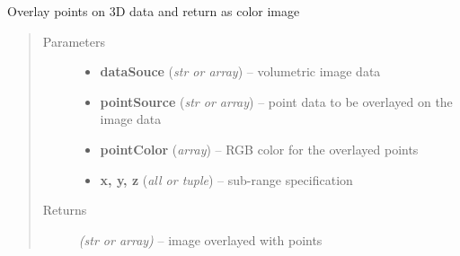 \documentclass[letterpaper,10pt,english]{sphinxmanual}
\begin{document}

\begin{fulllineitems}
\label{api/ClearMap.Visualization:ClearMap.Visualization.Plot.overlayPoints}
Overlay points on 3D data and return as color image
\begin{quote}\begin{description}
\item[{Parameters}] \leavevmode\begin{itemize}
\item {} 
\textbf{dataSouce} (\emph{str or array}) --
volumetric image data

\item {} 
\textbf{pointSource} (\emph{str or array}) --
point data to be overlayed on the image data

\item {} 
\textbf{pointColor} (\emph{array}) --
RGB color for the overlayed points

\item {} 
\textbf{x, y, z} (\emph{all or tuple}) --
sub-range specification

\end{itemize}

\item[{Returns}] \leavevmode
\emph{(str or array)} --
image overlayed with points

\end{description}\end{quote}




{\hyperref[api/ClearMap.Visualization:ClearMap.Visualization.Plot.overlayLabel]{\emph{}}}



\end{fulllineitems}

\end{document}
